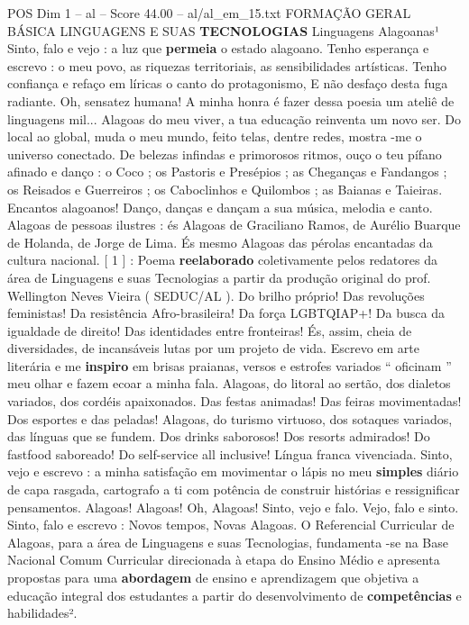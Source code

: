 \begin{textsample}{POS Dim 1 – al – Score 44.00 – al/al\_em\_15.txt}  \label{ex:f1_pos_155}
FORMAÇÃO GERAL BÁSICA LINGUAGENS E SUAS \textbf{TECNOLOGIAS} Linguagens Alagoanas¹ Sinto, falo e vejo : a luz que \textbf{permeia} o estado alagoano.
Tenho esperança e escrevo : o meu povo, as riquezas territoriais, as sensibilidades artísticas.
Tenho confiança e refaço em líricas o canto do protagonismo, E não desfaço desta fuga radiante.
Oh, sensatez humana!
A minha honra é fazer dessa poesia um ateliê de linguagens mil...
Alagoas do meu viver, a tua educação reinventa um novo ser.
Do local ao global, muda o meu mundo, feito telas, dentre redes, mostra -me o universo conectado.
De belezas infindas e primorosos ritmos, ouço o teu pífano afinado e danço : o Coco ; os Pastoris e Presépios ; as Cheganças e Fandangos ; os Reisados e Guerreiros ; os Caboclinhos e Quilombos ; as Baianas e Taieiras.
Encantos alagoanos!
Danço, danças e dançam a sua música, melodia e canto.
Alagoas de pessoas ilustres : és Alagoas de Graciliano Ramos, de Aurélio Buarque de Holanda, de Jorge de Lima.
És mesmo Alagoas das pérolas encantadas da cultura nacional. [ 1 ] : Poema \textbf{reelaborado} coletivamente pelos redatores da área de Linguagens e suas Tecnologias a partir da produção original do prof.
Wellington Neves Vieira ( SEDUC/AL ).
Do brilho próprio!
Das revoluções feministas!
Da resistência Afro-brasileira!
Da força LGBTQIAP+!
Da busca da igualdade de direito!
Das identidades entre fronteiras!
És, assim, cheia de diversidades, de incansáveis lutas por um projeto de vida.
Escrevo em arte literária e me \textbf{inspiro} em brisas praianas, versos e estrofes variados “ oficinam ” meu olhar e fazem ecoar a minha fala.
Alagoas, do litoral ao sertão, dos dialetos variados, dos cordéis apaixonados.
Das festas animadas!
Das feiras movimentadas!
Dos esportes e das peladas!
Alagoas, do turismo virtuoso, dos sotaques variados, das línguas que se fundem.
Dos drinks saborosos!
Dos resorts admirados!
Do fastfood saboreado!
Do self-service all inclusive!
Língua franca vivenciada.
Sinto, vejo e escrevo : a minha satisfação em movimentar o lápis no meu \textbf{simples} diário de capa rasgada, cartografo a ti com potência de construir histórias e ressignificar pensamentos.
Alagoas!
Alagoas!
Oh, Alagoas!
Sinto, vejo e falo.
Vejo, falo e sinto.
Sinto, falo e escrevo : Novos tempos, Novas Alagoas.
O Referencial Curricular de Alagoas, para a área de Linguagens e suas Tecnologias, fundamenta -se na Base Nacional Comum Curricular direcionada à etapa do Ensino Médio e apresenta propostas para uma \textbf{abordagem} de ensino e aprendizagem que objetiva a educação integral dos estudantes a partir do desenvolvimento de \textbf{competências} e habilidades².

\end{textsample}
